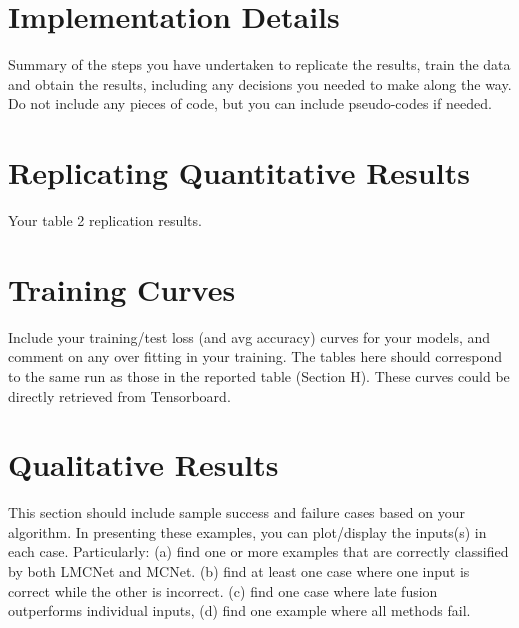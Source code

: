 \documentclass[conference]{IEEEtran}
\begin{document}
\section{Implementation Details}
Summary of the steps you have undertaken to replicate the results, train the data and obtain the results, including any decisions you needed to make along the way. Do not include any pieces of code, but you can include pseudo-codes if needed. 

\section{Replicating Quantitative Results}
Your table 2 replication results. 

\section{Training Curves}
Include your training/test loss (and avg accuracy) curves for your models, and comment on any over fitting in your training. The tables here should correspond to the same run as those in the reported table (Section H). These curves could be directly retrieved from Tensorboard. 

\section{Qualitative Results}
This section should include sample success and failure cases based on your algorithm. In presenting these examples, you can plot/display the inputs(s) in each case. Particularly: (a) find one or more examples that are correctly classified by both LMCNet and MCNet. (b) find at least one case where one input is correct while the other is incorrect. (c) find one case where late fusion outperforms individual inputs, (d) find one example where all methods fail. 

\end{document}
